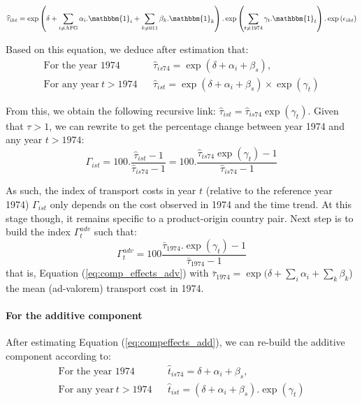 \documentclass[a4paper,11pt]{article}
\begin{document}
\begin{equation*}
\widehat{\tau}_{ikt}=\exp\left(\delta + \sum_{i \neq \text{AFG}}\alpha_i.\mathbbm{1}_i+\sum_{k\neq \text{011}}\beta_k.\mathbbm{1}_k\right).\exp\left(\sum_{t \neq 1974}\gamma_t.\mathbbm{1}_t\right) .\exp\left(\epsilon_{ikt}\right)
\end{equation*}

Based on this equation, we deduce after estimation that:
\begin{eqnarray*}
\text{For the year 1974}&& \widehat{\tau}_{is74} = \exp(\delta +\alpha_i+\beta_s), \\
\text{For any year}~t> 1974&& \widehat{\tau}_{ist} = \exp(\delta +\alpha_i+\beta_s)\times \exp(\gamma_t)
\end{eqnarray*}

From this, we obtain the following recursive link: $\widehat{\tau}_{ist} = \widehat{\tau}_{is74}\exp(\gamma_t)$. Given that $\tau >1$, we can rewrite to get the percentage change between year 1974 and any year $t>1974$:
\begin{equation*}
\Gamma_{ist} = 100.\frac{\widehat{\tau}_{ist}-1}{\widehat{\tau}_{is74}-1} = 100.\frac{\widehat{\tau}_{is74}\exp(\gamma_t)-1}{\widehat{\tau}_{is74}-1}
\end{equation*}

As such, the index of transport costs in year $t$ (relative to the reference year 1974) $\Gamma_{ist} $  only depends on the cost observed in 1974 and the time trend. At this stage though, it remains specific to a product-origin country pair. Next step is to build the index $\Gamma^{adv}_t$ such that:
\begin{equation}
 \Gamma^{adv}_t= 100\frac {\bar{\tau}_{1974}.\exp(\gamma_t)-1} {\bar{\tau}_{1974}-1}  \label{eq:tcadv_compoeffect}
\end{equation}
\noindent that is, Equation (\ref{eq:comp_effects_adv}) with $\bar{\tau}_{1974} = \exp(\delta + \sum_i \alpha_i + \sum_k \beta_k$) the mean (ad-valorem) transport cost in 1974.

\paragraph{For the additive component} After estimating Equation (\ref{eq:compeffects_add}), we can re-build the additive component according to:
\begin{eqnarray*}
\text{For the year 1974}&&\widehat{t}_{is74}=  \delta + \alpha_i+ \beta_s, \\
\text{For any year}~t> 1974&&\widehat{t}_{ist}=\left(\delta + \alpha_i+ \beta_s\right).\exp(\gamma_t)
\end{eqnarray*}
\end{document}
